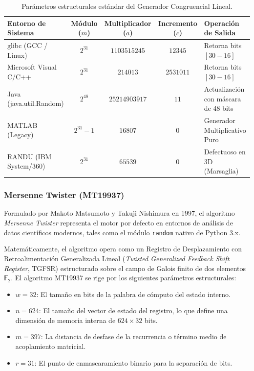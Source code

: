 \documentclass{article}
\begin{document}
\begin{table}[htbp]
    \centering
    \caption{Parámetros estructurales estándar del Generador Congruencial Lineal.}
    \label{tab:gcl_parameters}
    \vspace{0.2cm}
    \begin{tabular}{lcccl}
        \toprule
        \textbf{Entorno de Sistema} & \textbf{Módulo ($m$)} & \textbf{Multiplicador ($a$)} & \textbf{Incremento ($c$)} & \textbf{Operación de Salida} \\
        \midrule
        glibc (GCC / Linux) & $2^{31}$ & $1103515245$ & $12345$ & Retorna bits $[30-16]$ \\
        Microsoft Visual C/C++ & $2^{31}$ & $214013$ & $2531011$ & Retorna bits $[30-16]$ \\
        Java (java.util.Random) & $2^{48}$ & $25214903917$ & $11$ & Actualización con máscara de 48 bits \\
        MATLAB (Legacy) & $2^{31}-1$ & $16807$ & $0$ & Generador Multiplicativo Puro \\
        RANDU (IBM System/360) & $2^{31}$ & $65539$ & $0$ & Defectuoso en 3D (Marsaglia) \\
        \bottomrule
    \end{tabular}
\end{table}

\subsubsection{Mersenne Twister (MT19937)}
Formulado por Makoto Matsumoto y Takuji Nishimura en 1997, el algoritmo \emph{Mersenne Twister} representa el motor por defecto en entornos de análisis de datos científicos modernos, tales como el módulo \texttt{random} nativo de Python 3.x. 

Matemáticamente, el algoritmo opera como un Registro de Desplazamiento con Retroalimentación Generalizada Lineal (\emph{Twisted Generalized Feedback Shift Register}, TGFSR) estructurado sobre el campo de Galois finito de dos elementos $\mathbb{F}_2$. El algoritmo MT19937 se rige por los siguientes parámetros estructurales:
\begin{itemize}
    \item $w = 32$: El tamaño en bits de la palabra de cómputo del estado interno.
    \item $n = 624$: El tamaño del vector de estado del registro, lo que define una dimensión de memoria interna de $624 \times 32$ bits.
    \item $m = 397$: La distancia de desfase de la recurrencia o término medio de acoplamiento matricial.
    \item $r = 31$: El punto de enmascaramiento binario para la separación de bits.
\end{itemize}
\end{document}
